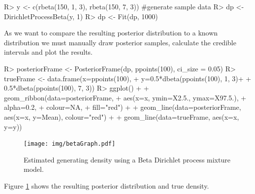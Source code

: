 \documentclass[nojss]{jss}
\begin{document}
\begin{Schunk}
\begin{Sinput}
R> y <- c(rbeta(150, 1, 3), rbeta(150, 7, 3)) #generate sample data
R> dp <- DirichletProcessBeta(y, 1)
R> dp <- Fit(dp, 1000)
\end{Sinput}
\end{Schunk}

As we want to compare the resulting posterior distribution to a known distribution we must manually draw posterior samples, calculate the credible intervals and plot the results.
\newpage
\begin{Schunk}
\begin{Sinput}
R> posteriorFrame <- PosteriorFrame(dp, ppoints(100), ci_size = 0.05)
R> trueFrame <- data.frame(x=ppoints(100),
+                          y=0.5*dbeta(ppoints(100), 1, 3)+
+                            0.5*dbeta(ppoints(100), 7, 3))
R> ggplot() +
+    geom_ribbon(data=posteriorFrame,
+                aes(x=x, ymin=X2.5., ymax=X97.5.),
+                alpha=0.2,
+                colour=NA,
+                fill="red") +
+    geom_line(data=posteriorFrame, aes(x=x, y=Mean), colour="red") +
+    geom_line(data=trueFrame, aes(x=x, y=y))
\end{Sinput}
\end{Schunk}

\begin{figure}[tb]
	\centering
	\texttt{[image: img/betaGraph.pdf]}
	\caption{Estimated generating density using a Beta Dirichlet process mixture model.}
	\label{fig:densitybounded}
\end{figure}
Figure \ref{fig:densitybounded} shows the resulting posterior distribution and true density.
\end{document}

